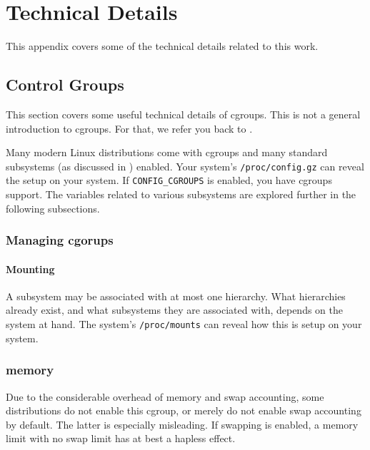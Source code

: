 
\chapter{Technical Details}

This appendix covers some of the technical details related to this work.


\section{Control Groups}

\label{appendix:technical-details:control-groups}

This section covers some useful technical details of cgroups. This is not a
general introduction to cgroups. For that, we refer you back to
.

Many modern Linux distributions come with cgroups and many standard subsystems
(as discussed in ) enabled.  Your
system's \texttt{/proc/config.gz} can reveal the setup on your
system\cite{man-5-proc}.  If \texttt{CONFIG\_CGROUPS} is enabled, you have
cgroups support. The variables related to various subsystems are explored
further in the following subsections.

\subsection{Managing cgorups}

\subsubsection{Mounting}

A subsystem may be associated with at most one hierarchy. What hierarchies
already exist, and what subsystems they are associated with, depends on the
system at hand. The system's \texttt{/proc/mounts} can reveal how this is setup
on your system\cite{man-5-proc}.

\subsection{memory}

Due to the considerable overhead of memory and swap accounting, some
distributions do not enable this cgroup, or merely do not enable swap
accounting by default. The latter is especially misleading. If swapping is
enabled, a memory limit with no swap limit has at best a hapless effect.

